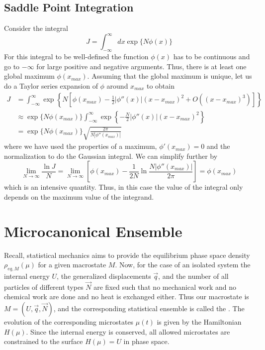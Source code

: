 \documentclass[12pt, a4paper, oneside, openright, titlepage]{book}
\begin{document}
\subsection{Saddle Point Integration}
Consider the integral \begin{equation*}
    J = \int_{-\infty}^{\infty}dx\exp\{N\phi(x)\}
\end{equation*}
For this integral to be well-defined the function $\phi(x)$ has to be continuous and go to $-\infty$ for large positive and negative arguments. Thus, there is at least one global maximum $\phi(x_{max})$. Assuming that the global maximum is unique, let us do a Taylor series expansion of $\phi$ around $x_{max}$ to obtain \begin{align*}
    J &= \int_{-\infty}^{\infty}\exp\left\{N\left[\phi(x_{max}) - \frac{1}{2}|\phi''(x)|(x-x_{max})^2+O((x-x_{max})^3)\right]\right\} \\
    &\approx \exp\{N\phi(x_{max})\}\int_{-\infty}^{\infty}\exp\left\{-\frac{N}{2}|\phi''(x)|(x-x_{max})^2\right\} \\
    &= \exp\{N\phi(x_{max})\}\sqrt{\frac{2\pi}{N|\phi''(x_{max})|}}
\end{align*}
where we have used the properties of a maximum, $\phi'(x_{max}) = 0$ and the normalization to do the Gaussian integral. We can simplify further by \begin{equation*}
    \lim\limits_{N\rightarrow \infty}\frac{\ln J}{N} = \lim\limits_{N\rightarrow \infty}\left[\phi(x_{max}) - \frac{1}{2N}\ln\frac{N|\phi''(x_{max})|}{2\pi}\right] = \phi(x_{max})
\end{equation*}
which is an intensive quantity. Thus, in this case the value of the integral only depends on the maximum value of the integrand.


\section{Microcanonical Ensemble}

Recall, statistical mechanics aims to provide the equilibrium phase space density $\rho_{eq,M}(\mu)$ for a given macrostate $M$. Now, for the case of an isolated system the internal energy $U$, the generalized displacements $\vec{q}$, and the number of all particles of different types $\vec{N}$ are fixed such that no mechanical work and no chemical work are done and no heat is exchanged either. Thus our macrostate is $M = (U,\vec{q},\vec{N})$, and the corresponding statistical ensemble is called the . The evolution of the corresponding microstates $\mu(t)$ is given by the Hamiltonian $H(\mu)$. Since the internal energy is conserved, all allowed microstates are constrained to the surface $H(\mu)  = U$ in phase space.
\end{document}
